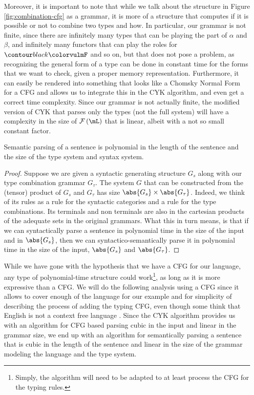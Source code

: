 \medskip

Moreover, it is important to note that while we talk about the structure in
Figure \ref{fig:combination-cfg} as a grammar, it is more of a structure that
computes if it is possible or not to combine two types and how.
In particular, our grammar is not finite, since there are infinitely many types
that can be playing the part of $\alpha$ and $\beta$, and infinitely many
functors that can play the roles for $\f{F}$ and so on, but that does not pose
a problem, as recognizing the general form of a type can be done in constant
time for the forms that we want to check, given a proper memory representation.
Furthermore, it can easily be rendered into something that looks like a
Chomsky Normal Form for a CFG and allows us to integrate this in the CYK
algorithm, and even get a correct time complexity.
Since our grammar is not actually finite, the modified version of CYK that
parses only the types (not the full system) will have a complexity in the
size of $\mathcal{F}\left(\mL\right)$ that is linear, albeit with a not so
small constant factor.

\begin{thm}
	\label{thm:ptime-parse}
	Semantic parsing of a sentence is polynomial in the length of the	sentence
	and the size of the type system and syntax system.
\end{thm}
\begin{proof}
	Suppose we are given a syntactic generating structure $G_{s}$ along with our
	type combination grammar $G_{\tau}$.
	The system $G$ that can be constructed from the (tensor) product of $G_{s}$ and
	$G_{\tau}$ has size $\abs{G_{s}}\times \abs{G_{\tau}}$.
	Indeed, we think of its rules as a rule for the syntactic categories and a rule
	for the type combinations. Its terminals and non terminals are also in the
	cartesian products of the adequate sets in the original grammars.
	What this in turn means, is that if we can syntactically parse a sentence in
	polynomial time in the size of the input and in $\abs{G_{s}}$, then we can
	syntactico-semantically parse it in polynomial time in the size of the input,
	$\abs{G_{s}}$ and $\abs{G_{\tau}}$.
\end{proof}

While we have gone with the hypothesis that we have a CFG for our language,
any type of polynomial-time structure could work\footnote{Simply, the algorithm
	will need to be	adapted to at least process the CFG for the typing rules.},
as long as it is more expressive than a CFG.
We will do the following analysis using a CFG since it allows to cover enough of
the language for our example and for simplicity of describing the process of
adding the typing CFG, even though some think that English is not a context
free language \cite{higginbothamEnglishNotContextFree1984}.
Since the CYK algorithm provides us with an algorithm for CFG based parsing
cubic in the input and linear in the grammar size, we end up with an algorithm
for semantically parsing a sentence that is cubic in the length of the sentence
and linear in the size of the grammar modeling the language and the type system.

